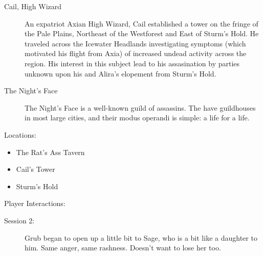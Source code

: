 \documentclass[11pt]{article}
\theoremstyle{definition}
\theoremstyle{remark}
\begin{document}
\begin{description}
\begin{description}
\item[Cail, High Wizard]

An expatriot Axian High Wizard, Cail established a tower on the fringe of the Pale Plains, Northeast of the Westforest and East of Sturm's Hold.  He traveled across the Icewater Headlands investigating symptoms (which motivated his flight from Axia) of increased undead activity across the region. His interest in this subject lead to his assasination by parties unknown upon his and Alira's elopement from Sturm's Hold.

\item[The Night's Face]

The Night's Face is a well-known guild of assassins. The have guildhouses in most large cities, and their modus operandi is simple: a life for a life.

\end{description}

\item{Locations:}

\begin{itemize}

\item{ The Rat's Ass Tavern }

\item{ Cail's Tower }

\item{ Sturm's Hold }

\end{itemize}

\item{Player Interactions:}

\begin{description}

\item[Session 2: ] {Grub began to open up a little bit to Sage, who is a bit like a daughter to him. Same anger, same rashness. Doesn't want to lose her too.}

\end{description}

\end{description}
\end{document}
